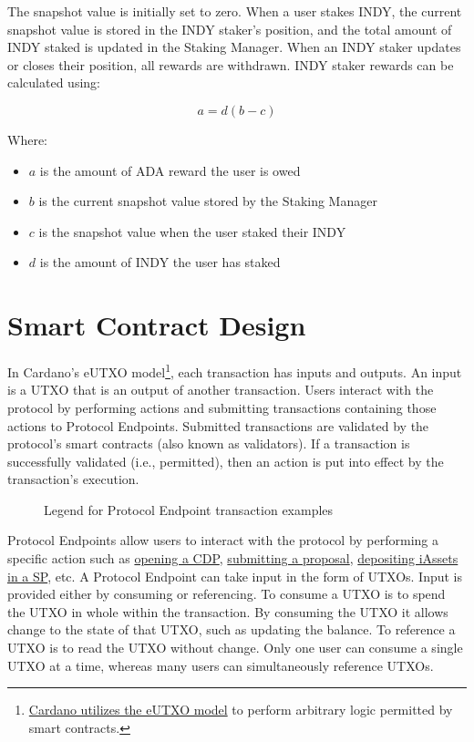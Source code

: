 \documentclass{article}
\begin{document}
\begin{sloppypar}
The snapshot value is initially set to zero. When a user stakes INDY,
the current snapshot value is stored in the INDY staker's position, and
the total amount of INDY staked is updated in the Staking Manager. When
an INDY staker updates or closes their position, all rewards are
withdrawn. INDY staker rewards can be calculated using:

\[a = d\left( b - c \right)\]

Where:

\begin{itemize}
\item
  \(a\) is the amount of ADA reward the user is owed
\item
  \(b\) is the current snapshot value stored by the Staking Manager
\item
  \(c\) is the snapshot value when the user staked their INDY
\item
  \(d\) is the amount of INDY the user has staked
\end{itemize}

\hypertarget{smart-contract-design}{%
\section{Smart Contract Design}\label{smart-contract-design}}

In Cardano's eUTXO model\footnote{\href{https://docs.cardano.org/learn/eutxo-explainer}{Cardano
  utilizes the eUTXO model} to perform arbitrary logic permitted by
  smart contracts.}, each transaction has inputs and outputs. An input
is a UTXO that is an output of another transaction. Users interact with
the protocol by performing actions and submitting transactions
containing those actions to Protocol Endpoints. Submitted transactions
are validated by the protocol's smart contracts (also known as
validators). If a transaction is successfully validated (i.e.,
permitted), then an action is put into effect by the transaction's
execution.

\hypertarget{diagram-legend}{%
\begin{figure}[htbp]
\centering

\caption{Legend for Protocol Endpoint transaction examples}
\end{figure}}

Protocol Endpoints allow users to interact with the protocol by
performing a specific action such as
\protect\hyperlink{collateralized-debt-positions}{opening a CDP},
\protect\hyperlink{governance-proposal-process}{submitting a proposal},
\protect\hyperlink{stability-pools}{depositing iAssets in a SP}, etc. A
Protocol Endpoint can take input in the form of UTXOs. Input is provided
either by consuming or referencing. To consume a UTXO is to spend the
UTXO in whole within the transaction. By consuming the UTXO it allows
change to the state of that UTXO, such as updating the balance. To
reference a UTXO is to read the UTXO without change. Only one user can
consume a single UTXO at a time, whereas many users can simultaneously
reference UTXOs.


\end{sloppypar}
\end{document}
